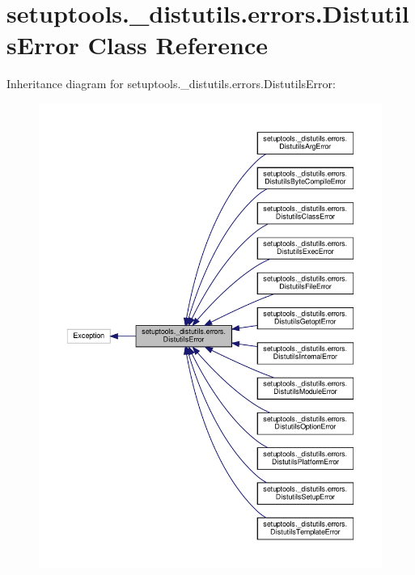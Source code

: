 \hypertarget{classsetuptools_1_1__distutils_1_1errors_1_1DistutilsError}{}\section{setuptools.\+\_\+distutils.\+errors.\+Distutils\+Error Class Reference}
\label{classsetuptools_1_1__distutils_1_1errors_1_1DistutilsError}


Inheritance diagram for setuptools.\+\_\+distutils.\+errors.\+Distutils\+Error\+:
\nopagebreak
\begin{figure}[H]
\begin{center}
\leavevmode
\includegraphics[width=350pt]{classsetuptools_1_1__distutils_1_1errors_1_1DistutilsError__inherit__graph}
\end{center}
\end{figure}


